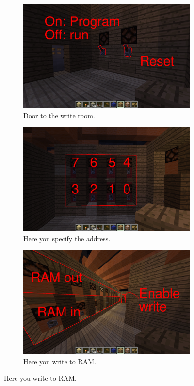 \documentclass{article}
\begin{document}
\begin{figure}[h]
	\centering
	\begin{subfigure}{0.35\textwidth}
		\includegraphics[width=\textwidth]{WriteDoor.png}
		\caption{Door to the write room.\label{door}}
	\end{subfigure}\hfill
	\begin{subfigure}{0.3\textwidth}
		\includegraphics[width=\textwidth]{UIaddress.png}
		\caption{Here you specify the address.\label{Uaddress}}
	\end{subfigure}
	\begin{subfigure}{0.3\textwidth}
		\includegraphics[width=\textwidth]{UI Ram io.png}
		\caption{Here you write to RAM.}
	\end{subfigure}
	
\end{figure}
\end{document}
